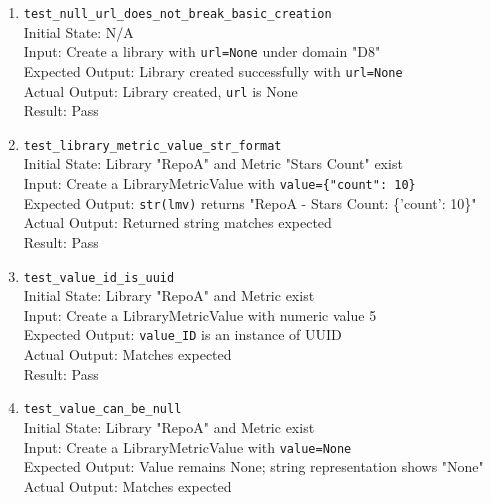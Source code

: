 \documentclass[12pt, titlepage]{article}
\begin{document}
\begin{enumerate}
      \\Expected Output: URL uniqueness is enforced per domain only
      \\Actual Output: Both libraries exist in their respective domains
      \\Result: Pass
    \item \texttt{test\_null\_url\_does\_not\_break\_basic\_creation} \label{test-null-url-does-not-break-basic-creation}
      \\Initial State: N/A
      \\Input: Create a library with \texttt{url=None} under domain "D8"
      \\Expected Output: Library created successfully with \texttt{url=None}
      \\Actual Output: Library created, \texttt{url} is None
      \\Result: Pass
    \item \texttt{test\_library\_metric\_value\_str\_format} \label{test-library-metric-value-str-format}
      \\Initial State: Library "RepoA" and Metric "Stars Count" exist
      \\Input: Create a LibraryMetricValue with \texttt{value=\{"count": 10\}}
      \\Expected Output: \texttt{str(lmv)} returns "RepoA - Stars Count: \{'count': 10\}"
      \\Actual Output: Returned string matches expected
      \\Result: Pass
    \item \texttt{test\_value\_id\_is\_uuid} \label{test-value-id-is-uuid}
      \\Initial State: Library "RepoA" and Metric exist
      \\Input: Create a LibraryMetricValue with numeric value 5
      \\Expected Output: \texttt{value\_ID} is an instance of UUID
      \\Actual Output: Matches expected
      \\Result: Pass
    \item \texttt{test\_value\_can\_be\_null} \label{test-value-can-be-null}
      \\Initial State: Library "RepoA" and Metric exist
      \\Input: Create a LibraryMetricValue with \texttt{value=None}
      \\Expected Output: Value remains None; string representation shows "None"
      \\Actual Output: Matches expected

\end{enumerate}
\end{document}
